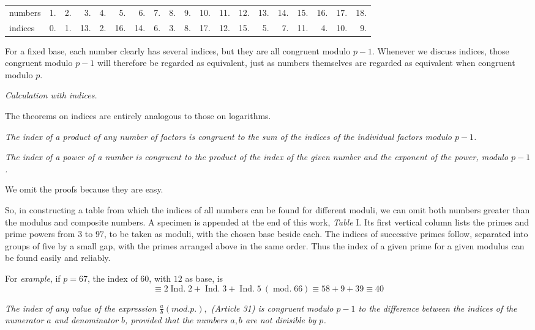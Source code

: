 \begin{center}
\begingroup\small\setlength{\tabcolsep}{1.5pt}
\begin{tabular}{@{}l@{\quad}*{18}{r}@{}}
numbers & 1. & 2. & 3. & 4. & 5. & 6. & 7. & 8. & 9. & 10. & 11. & 12. & 13. & 14. & 15. & 16. & 17. & 18.\\
indices & 0. & 1. & 13. & 2. & 16. & 14. & 6. & 3. & 8. & 17. & 12. & 15. & 5. & 7. & 11. & 4. & 10. & 9.
\end{tabular}
\endgroup
\end{center}

For a fixed base, each number clearly has several indices, but they are all congruent modulo $p-1$. Whenever we discuss indices, those congruent modulo $p-1$ will therefore be regarded as equivalent, just as numbers themselves are regarded as equivalent when congruent modulo $p$.

\begin{center}\emph{Calculation with indices.}\end{center}

The theorems on indices are entirely analogous to those on logarithms.

\emph{The index of a product of any number of factors is congruent to the sum of the indices of the individual factors modulo $p-1$.}

\emph{The index of a power of a number is congruent to the product of the index of the given number and the exponent of the power, modulo $p-1$.}

We omit the proofs because they are easy.

So, in constructing a table from which the indices of all numbers can be found for different moduli, we can omit both numbers greater than the modulus and composite numbers. A specimen is appended at the end of this work, \emph{Table} I. Its first vertical column lists the primes and prime powers from $3$ to $97$, to be taken as moduli, with the chosen base beside each. The indices of successive primes follow, separated into groups of five by a small
gap, with the primes arranged above in the same order. Thus the index of a given prime for a given modulus can be found easily and reliably.

For \emph{example}, if $p=67$, the index of $60$, with $12$ as base, is
\[\equiv2\operatorname{Ind.}2+\operatorname{Ind.}3+\operatorname{Ind.}5\ (\operatorname{mod.}66)\equiv58+9+39\equiv40\]

\emph{The index of any value of the expression $\frac{a}{b}(\mathit{mod.}p.),$ (Article 31) is congruent modulo $p-1$ to the difference between the indices of the numerator $a$ and denominator $b$, provided that the numbers $a,b$ are not divisible by $p$.}

